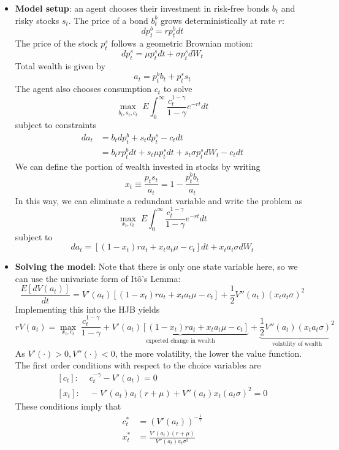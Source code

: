 \documentclass[12pt]{article}
\begin{document}
\begin{itemize}
    \item \textbf{Model setup}: an agent chooses their investment in risk-free bonds $b_t$ and risky stocks $s_t$. The price of a bond $b_t^b$ grows deterministically at rate $r$:
    \[dp_t^b = rp_t^bdt\]
    The price of the stock $p_t^s$ follows a geometric Brownian motion:
    \[dp_t^s = \mu p_t^sdt + \sigma p_t^s dW_t\]
    Total wealth is given by
    \[a_t = p_t^bb_t + p_t^ss_t\]
    The agent also chooses consumption $c_t$ to solve
    \[\max_{b_t,s_t,c_t}\; E\int_0^{\infty}\frac{c_t^{1-\gamma}}{1-\gamma}e^{-rt}dt\]
    subject to constraints
    \[\begin{split}
        da_t &= b_tdp_t^b + s_tdp_t^s - c_tdt \\
        &= b_trp_t^bdt + s_t\mu p_t^sdt + s_t \sigma p_t^sdW_t - c_tdt
    \end{split}\]
    We can define the portion of wealth invested in stocks by writing
    \[x_t \equiv \frac{p_ts_t}{a_t} = 1 - \frac{p_t^bb_t}{a_t}\]
    In this way, we can eliminate a redundant variable and write the problem as
    \[\max_{x_t,c_t}\; E\int_0^{\infty}\frac{c_t^{1-\gamma}}{1-\gamma}e^{-rt}dt\]
    subject to
    \[da_t = [(1-x_t)ra_t + x_ta_t\mu - c_t]dt + x_ta_t\sigma dW_t\]
    \item \textbf{Solving the model}: Note that there is only one state variable here, so we can use the univariate form of Itô's Lemma:
    \[\frac{E[dV(a_t)]}{dt} = V'(a_t)\left[(1-x_t)ra_t + x_ta_t\mu-c_t\right] + \frac{1}{2}V''(a_t)\left(x_ta_t\sigma\right)^2\]
    Implementing this into the HJB yields
    \[rV(a_t) = \max_{x_t,c_t}\; \frac{c_t^{1-\gamma}}{1-\gamma} + \underbrace{V'(a_t)\left[(1-x_t)ra_t + x_ta_t\mu-c_t\right]}_{\text{expected change in wealth}} + \underbrace{\frac{1}{2}V''(a_t)\left(x_ta_t\sigma\right)^2}_{\text{volatility of wealth}}\]
    As $V'(\cdot)>0, V''(\cdot) < 0$, the more volatility, the lower the value function. The first order conditions with respect to the choice variables are
    \[\begin{split}
        [c_t]:&\; c_t^{-\gamma} - V'(a_t) = 0 \\
        [x_t]:&\; -V'(a_t)a_t(r+\mu) + V''(a_t)x_t(a_t\sigma)^2 = 0
    \end{split}\]
    These conditions imply that
    \[\begin{split}
        c_t^* &= \left(V'(a_t)\right)^{-\frac{1}{\gamma}} \\
        x_t^* &=\frac{V'(a_t)(r+\mu)}{V''(a_t)a_t\sigma^2}

\end{split}\]
\end{itemize}
\end{document}
